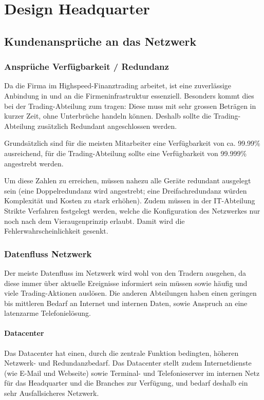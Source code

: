 \section{Design Headquarter}

\subsection{Kundenansprüche an das Netzwerk}

\subsubsection{Ansprüche Verfügbarkeit / Redundanz }
Da die Firma im Highspeed-Finanztrading arbeitet, ist eine zuverlässige Anbindung in und an die Firmeninfrastruktur essenziell. Besonders kommt dies bei der Trading-Abteilung zum tragen: Diese muss mit sehr grossen Beträgen in kurzer Zeit, ohne Unterbrüche handeln können. Deshalb sollte die Trading-Abteilung zusätzlich Redundant angeschlossen werden.

Grundsätzlich sind für die meisten Mitarbeiter eine Verfügbarkeit von ca. 99.99\% ausreichend, für die Trading-Abteilung sollte eine Verfügbarkeit von 99.999\% angestrebt werden.

Um diese Zahlen zu erreichen, müssen nahezu alle Geräte redundant ausgelegt sein (eine Doppelredundanz wird angestrebt; eine Dreifachredundanz würden Komplexität und Kosten zu stark erhöhen). Zudem müssen in der IT-Abteilung Strikte Verfahren festgelegt werden, welche die Konfiguration des Netzwerkes nur noch nach dem Vieraugenprinzip erlaubt. Damit wird die Fehlerwahrscheinlichkeit gesenkt.

\subsubsection{Datenfluss Netzwerk}

Der meiste Datenfluss im Netzwerk wird wohl von den Tradern ausgehen, da diese immer über aktuelle Ereignisse informiert sein müssen sowie häufig und viele Trading-Aktionen auslösen. Die anderen Abteilungen haben einen geringen bis mittleren Bedarf an Internet und internen Daten, sowie Anspruch an eine latenzarme Telefonielösung.

\paragraph{Datacenter}
Das Datacenter hat einen, durch die zentrale Funktion bedingten, höheren Netzwerk- und Redundanzbedarf. Das Datacenter stellt zudem Internetdienste (wie E-Mail und Webseite) sowie Terminal- und Telefonieserver im internen Netz für das Headquarter und die Branches zur Verfügung, und bedarf deshalb ein sehr Ausfallsicheres Netzwerk.

